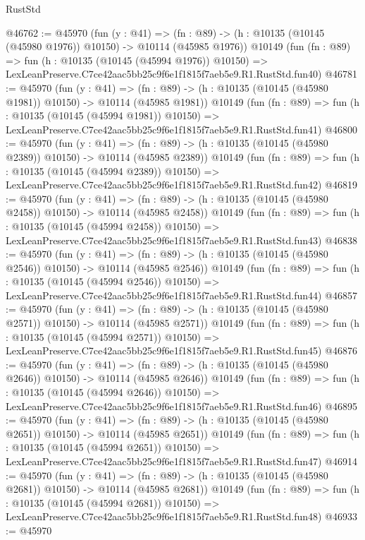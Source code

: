 \begin{lexlean}{RustStd}
\begin{coremodule}
@46762 := @45970
    (fun (y : @41) =>
    (fn : @89) -> (h : @10135 (@10145 (@45980 @1976)) @10150) -> @10114 (@45985 @1976))
    @10149
    (fun (fn : @89) =>
    fun (h : @10135 (@10145 (@45994 @1976)) @10150) =>
    LexLeanPreserve.C7ce42aac5bb25c9f6e1f1815f7aeb5e9.R1.RustStd.fun40)
@46781 := @45970
    (fun (y : @41) =>
    (fn : @89) -> (h : @10135 (@10145 (@45980 @1981)) @10150) -> @10114 (@45985 @1981))
    @10149
    (fun (fn : @89) =>
    fun (h : @10135 (@10145 (@45994 @1981)) @10150) =>
    LexLeanPreserve.C7ce42aac5bb25c9f6e1f1815f7aeb5e9.R1.RustStd.fun41)
@46800 := @45970
    (fun (y : @41) =>
    (fn : @89) -> (h : @10135 (@10145 (@45980 @2389)) @10150) -> @10114 (@45985 @2389))
    @10149
    (fun (fn : @89) =>
    fun (h : @10135 (@10145 (@45994 @2389)) @10150) =>
    LexLeanPreserve.C7ce42aac5bb25c9f6e1f1815f7aeb5e9.R1.RustStd.fun42)
@46819 := @45970
    (fun (y : @41) =>
    (fn : @89) -> (h : @10135 (@10145 (@45980 @2458)) @10150) -> @10114 (@45985 @2458))
    @10149
    (fun (fn : @89) =>
    fun (h : @10135 (@10145 (@45994 @2458)) @10150) =>
    LexLeanPreserve.C7ce42aac5bb25c9f6e1f1815f7aeb5e9.R1.RustStd.fun43)
@46838 := @45970
    (fun (y : @41) =>
    (fn : @89) -> (h : @10135 (@10145 (@45980 @2546)) @10150) -> @10114 (@45985 @2546))
    @10149
    (fun (fn : @89) =>
    fun (h : @10135 (@10145 (@45994 @2546)) @10150) =>
    LexLeanPreserve.C7ce42aac5bb25c9f6e1f1815f7aeb5e9.R1.RustStd.fun44)
@46857 := @45970
    (fun (y : @41) =>
    (fn : @89) -> (h : @10135 (@10145 (@45980 @2571)) @10150) -> @10114 (@45985 @2571))
    @10149
    (fun (fn : @89) =>
    fun (h : @10135 (@10145 (@45994 @2571)) @10150) =>
    LexLeanPreserve.C7ce42aac5bb25c9f6e1f1815f7aeb5e9.R1.RustStd.fun45)
@46876 := @45970
    (fun (y : @41) =>
    (fn : @89) -> (h : @10135 (@10145 (@45980 @2646)) @10150) -> @10114 (@45985 @2646))
    @10149
    (fun (fn : @89) =>
    fun (h : @10135 (@10145 (@45994 @2646)) @10150) =>
    LexLeanPreserve.C7ce42aac5bb25c9f6e1f1815f7aeb5e9.R1.RustStd.fun46)
@46895 := @45970
    (fun (y : @41) =>
    (fn : @89) -> (h : @10135 (@10145 (@45980 @2651)) @10150) -> @10114 (@45985 @2651))
    @10149
    (fun (fn : @89) =>
    fun (h : @10135 (@10145 (@45994 @2651)) @10150) =>
    LexLeanPreserve.C7ce42aac5bb25c9f6e1f1815f7aeb5e9.R1.RustStd.fun47)
@46914 := @45970
    (fun (y : @41) =>
    (fn : @89) -> (h : @10135 (@10145 (@45980 @2681)) @10150) -> @10114 (@45985 @2681))
    @10149
    (fun (fn : @89) =>
    fun (h : @10135 (@10145 (@45994 @2681)) @10150) =>
    LexLeanPreserve.C7ce42aac5bb25c9f6e1f1815f7aeb5e9.R1.RustStd.fun48)
@46933 := @45970

\end{coremodule}
\end{lexlean}
